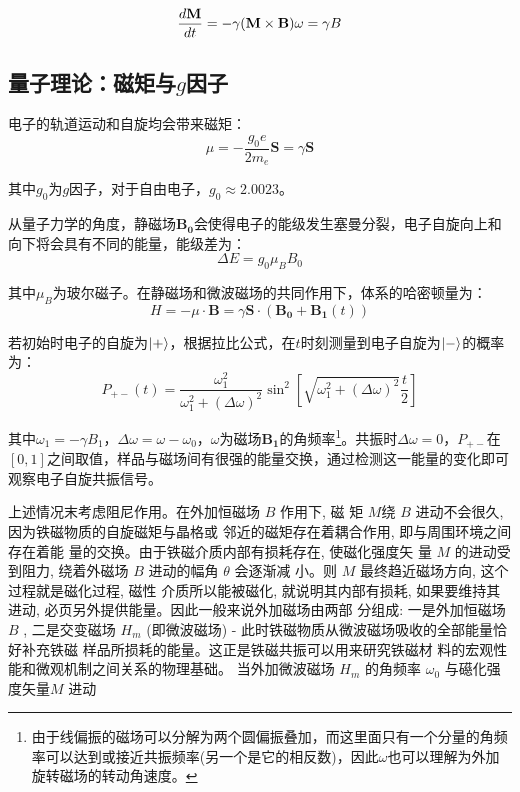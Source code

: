 \documentclass{buaaemp}
\begin{document}
\begin{equation}
    \frac{d \mathbf{M}}{d t}=-\gamma(\mathbf{M} \times \mathbf{B}) \\
\omega=\gamma B
\end{equation}

\subsection{量子理论：磁矩与$g$因子}
	电子的轨道运动和自旋均会带来磁矩：
	$${\mu}=-\frac{g_0e}{2m_e}\mathbf{S}=\gamma \mathbf{S}$$
	
\newpage

 其中$g_0$为$g$因子，对于自由电子，$g_0\approx2.0023$。
	
从量子力学的角度，静磁场$\mathbf{B_0}$会使得电子的能级发生塞曼分裂，电子自旋向上和向下将会具有不同的能量，能级差为：$$\Delta E=g_0\mu_BB_0$$
	
	其中$\mu_B$为玻尔磁子。在静磁场和微波磁场的共同作用下，体系的哈密顿量为：$$H=-{\mu}\cdot\mathbf{B}=\gamma \mathbf{S}\cdot(\mathbf{B_0}+\mathbf{B_1}(t))$$
	
	若初始时电子的自旋为$\ket{+}$，根据拉比公式\cite{enwiki:1049655724}，在$t$时刻测量到电子自旋为$\ket{-}$的概率为：$$P_{+-}(t)=\frac{\omega_{1}^{2}}{\omega_{1}^{2}+(\Delta \omega)^{2}} \sin ^{2}\left[\sqrt{\omega_{1}^{2}+(\Delta \omega)^{2}} \frac{t}{2}\right]$$
	
	其中$\omega_1=-\gamma B_1$，$\Delta \omega=\omega-\omega_0$，$\omega$为磁场$\mathbf{B_1}$的角频率\footnote{由于线偏振的磁场可以分解为两个圆偏振叠加，而这里面只有一个分量的角频率可以达到或接近共振频率(另一个是它的相反数)，因此$\omega$也可以理解为外加旋转磁场的转动角速度。}。共振时$\Delta\omega=0$，$P_{+-}$在$[0,1]$之间取值，样品与磁场间有很强的能量交换，通过检测这一能量的变化即可观察电子自旋共振信号。

上述情况末考虑阻尼作用。在外加恒磁场  $B $ 作用下, 磁 矩 $ M  $绕  $B $ 进动不会很久, 因为铁磁物质的自旋磁矩与晶格或 邻近的磁矩存在着耦合作用, 即与周围环境之间存在着能 量的交换。由于铁磁介质内部有损耗存在, 使磁化强度矢 量 $ M $ 的进动受到阻力, 绕着外磁场 $ B $ 进动的幅角  $\theta$  会逐渐减 小。则 $ M$  最终趋近磁场方向, 这个过程就是磁化过程, 磁性 介质所以能被磁化, 就说明其内部有损耗, 如果要维持其 进动, 必页另外提供能量。因此一般来说外加磁场由两部 分组成: 一是外加恒磁场  $B$ , 二是交变磁场 $ H_{m}$  (即微波磁场) - 此时铁磁物质从微波磁场吸收的全部能量恰好补充铁磁 样品所损耗的能量。这正是铁磁共振可以用来研究铁磁材 料的宏观性能和微观机制之间关系的物理基础。
当外加微波磁场 $ H_{m}$  的角频率  $\omega_{0} $ 与礠化强度矢量$  M$  进动
\end{document}
